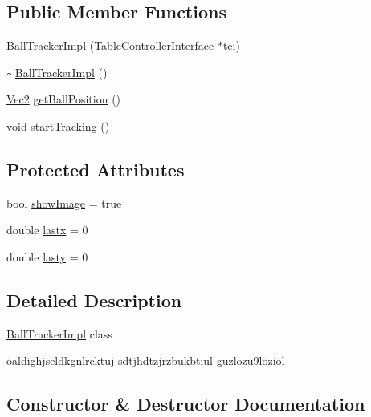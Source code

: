 \subsection*{Public Member Functions}
\begin{DoxyCompactItemize}
\item 
\hyperlink{class_ball_tracker_impl_a286916fd3631fd8dfffaa099f5ac1ace}{Ball\+Tracker\+Impl} (\hyperlink{class_table_controller_interface}{Table\+Controller\+Interface} $\ast$tci)
\item 
\hyperlink{class_ball_tracker_impl_ac0c591a55c71d4a4f62e44c32ef64432}{$\sim$\+Ball\+Tracker\+Impl} ()
\item 
\hyperlink{class_vec2}{Vec2} \hyperlink{class_ball_tracker_impl_a6edec8b002aa9e81b422cce0165e3b32}{get\+Ball\+Position} ()
\item 
void \hyperlink{class_ball_tracker_impl_adafeb5b7297cc09a42fdcd00aa52b367}{start\+Tracking} ()
\end{DoxyCompactItemize}
\subsection*{Protected Attributes}
\begin{DoxyCompactItemize}
\item 
bool \hyperlink{class_ball_tracker_impl_ad8ac7539ec3de2bb0657048366677bfa}{show\+Image} = true
\item 
double \hyperlink{class_ball_tracker_impl_a9588e1cae36137cab8f815802f9bbf22}{lastx} = 0
\item 
double \hyperlink{class_ball_tracker_impl_a350b9d1e03a2191baed4f33c11c7217e}{lasty} = 0
\end{DoxyCompactItemize}


\subsection{Detailed Description}
\hyperlink{class_ball_tracker_impl}{Ball\+Tracker\+Impl} class

öaldighjseldkgnlrcktuj sdtjhdtzjrzbukbtiul guzlozu9löziol 

\subsection{Constructor \& Destructor Documentation}
